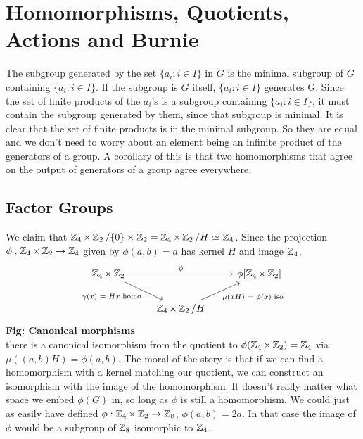 \section{Homomorphisms, Quotients, Actions and Burnie}
The subgroup generated by the set $\{a_i:i \in I\}$ in $G$ is the
minimal subgroup of $G$ containing $\{a_i:i \in I\}$. If the subgroup is $G$ itself, $\{a_i:i \in I\}$ generates G.
Since the set of finite products of the $a_i$'s is a
subgroup containing $\{a_i:i \in I\}$, it must contain the subgroup generated by them, since that subgroup is minimal.
It is clear that the set of finite products is in the minimal subgroup. So they are equal and we don't need to worry about an element being an infinite product of the generators of a group. A corollary of this is that two homomorphisms that agree on the output of generators of a group agree everywhere.
\subsection*{Factor Groups}
We claim that $\operatorname{\mathbb{Z}}_4 \times \operatorname{\mathbb{Z}}_2 / \{0\} \times \operatorname{\mathbb{Z}}_2  = \operatorname{\mathbb{Z}}_4 \times \operatorname{\mathbb{Z}}_2 / H \operatorname{\,\simeq\,} \operatorname{\mathbb{Z}}_4$. Since the projection
$\phi: \operatorname{\mathbb{Z}}_4 \times \operatorname{\mathbb{Z}}_2 \to \operatorname{\mathbb{Z}}_4$ given by $\phi(a,b) = a$ has kernel $H$ and image $\operatorname{\mathbb{Z}}_4$,
\[
\begin{tikzcd}
\Z_4 \times \Z_2 \arrow[rr, "\phi"] \arrow[dr, "\gamma\text{$(x)$ }=\text{ }Hx\text{ homo}"'] & & \phi[\Z_4 \times \Z_2] \\
& \Z_4 \times \Z_2/H \arrow[ur, "\mu(xH)\text{ $=$ }\phi(x)\text{ iso}"']
\end{tikzcd}
\]
\textbf{Fig: Canonical morphisms} \\ \newline
there is a canonical isomorphism from the quotient to $\phi(\operatorname{\mathbb{Z}}_4 \times \operatorname{\mathbb{Z}}_2) = \operatorname{\mathbb{Z}}_4$ via $\mu((a,b)H) = \phi(a,b)$. The moral of the story is that if we can find a homomorphism with a kernel matching our quotient, we can construct an isomorphism with the image of the homomorphism. It doesn't really matter what space we embed $\phi(G)$ in, so long as $\phi$ is still a homomorphism.
We could just as easily have defined $\phi: \operatorname{\mathbb{Z}}_4 \times \operatorname{\mathbb{Z}}_2 \to \operatorname{\mathbb{Z}}_8$, $\phi(a,b) = 2a$. In that case the image of $\phi$ would be a subgroup of $\operatorname{\mathbb{Z}}_8$ isomorphic to $\operatorname{\mathbb{Z}}_4$.
